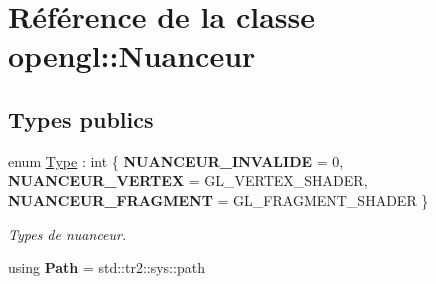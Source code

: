 \hypertarget{classopengl_1_1_nuanceur}{\section{Référence de la classe opengl\-:\-:Nuanceur}
\label{classopengl_1_1_nuanceur}
}
\subsection*{Types publics}
\begin{DoxyCompactItemize}
\item 
enum \hyperlink{classopengl_1_1_nuanceur_ad2783f2cbd6fb7a5f6dc5032f998c65e}{Type} \-: int \{ {\bfseries N\-U\-A\-N\-C\-E\-U\-R\-\_\-\-I\-N\-V\-A\-L\-I\-D\-E} = 0, 
{\bfseries N\-U\-A\-N\-C\-E\-U\-R\-\_\-\-V\-E\-R\-T\-E\-X} = G\-L\-\_\-\-V\-E\-R\-T\-E\-X\-\_\-\-S\-H\-A\-D\-E\-R, 
{\bfseries N\-U\-A\-N\-C\-E\-U\-R\-\_\-\-F\-R\-A\-G\-M\-E\-N\-T} = G\-L\-\_\-\-F\-R\-A\-G\-M\-E\-N\-T\-\_\-\-S\-H\-A\-D\-E\-R
 \}
\begin{DoxyCompactList}\small\item\em Types de nuanceur. \end{DoxyCompactList}\item 
\hypertarget{classopengl_1_1_nuanceur_aaa72e0922b812cff4d1660810121d5a3}{using {\bfseries Path} = std\-::tr2\-::sys\-::path}\label{classopengl_1_1_nuanceur_aaa72e0922b812cff4d1660810121d5a3}

\end{DoxyCompactItemize}
